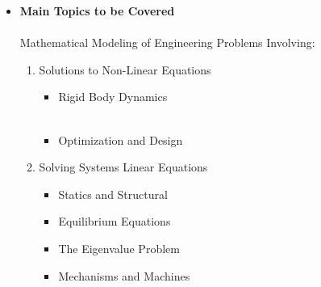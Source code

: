 \documentclass[11pt]{article}
\begin{document}
\begin{itemize}
\begin{itemize}
					\item  \hspace{1mm} \vspace{5mm}\\
					
					\item  \hspace{1mm} \vspace{5mm}\\
									
				\end{itemize}
	\newpage
	
	\item \textbf{ \LARGE Main Topics to be Covered}\\\\ 
	\Large{ Mathematical Modeling of Engineering Problems Involving: }\\
		\begin{enumerate}
			\item Solutions to Non-Linear Equations \vspace{5mm}\\
				\begin{itemize}
					\item Rigid Body Dynamics \\\\
					
					\item Optimization and Design \\
					
				\end{itemize}
			
			\item Solving Systems Linear Equations \vspace{5mm}\\
				\begin{multicols}{2}
				\begin{itemize}
					\item Statics and Structural  \\
					
					\item Equilibrium Equations\\
					
					\item The Eigenvalue Problem\\
					
					\item Mechanisms and Machines\\
					

\end{itemize}
\end{multicols}
\end{enumerate}
\end{itemize}
\end{document}
